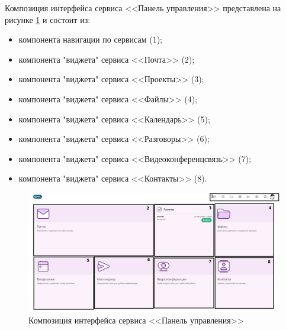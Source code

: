 Композиция интерфейса сервиса <<Панель управления>> представлена на рисунке \ref{templ:image4} и состоит из:
\begin{itemize}
  \item компонента навигации по сервисам (1);
  \item компонента "виджета" сервиса <<Почта>> (2);
  \item компонента "виджета" сервиса <<Проекты>> (3);
  \item компонента "виджета" сервиса <<Файлы>> (4);
  \item компонента "виджета" сервиса <<Календарь>> (5);
  \item компонента "виджета" сервиса <<Разговоры>> (6);
  \item компонента "виджета" сервиса <<Видеоконференцсвязь>> (7);
  \item компонента "виджета" сервиса <<Контакты>> (8).
\end{itemize}
\begin{figure}[H]
	\centering
	\includegraphics[width=1\linewidth]{images/дашборд}
	\caption{Композиция интерфейса сервиса <<Панель управления>>}
	\label{templ:image4}
\end{figure}

